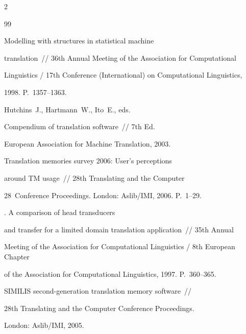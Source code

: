 \begin{multicols}{2}
{{\begin{thebibliography}{99}


 Modelling with structures in statistical machine 


translation~// 36th Annual Meeting of the Association for Computational 


Linguistics / 17th Conference (International) on Computational Linguistics, 


1998. P.~1357--1363.







Hutchins~J., Hartmann~W., Ito~E., eds.


Compendium of translation software~// 7th Ed.


European Association for Machine Translation, 2003.









Translation memories survey 2006: User's perceptions


around TM usage~//  28th Translating and the Computer


28~Conference Proceedings. London: Aslib/IMI, 2006. P.~1--29.







. A comparison of head transducers 


and transfer for a limited domain translation application~// 35th Annual 


Meeting of the Association for Computational Linguistics / 8th European Chapter 


of the Association for Computational Linguistics, 1997. P.~360--365.









SIMILIS second-generation translation memory software~//


28th Translating and the Computer Conference Proceedings.


London: Aslib/IMI, 2005.










\end{thebibliography}}}
\end{multicols}
